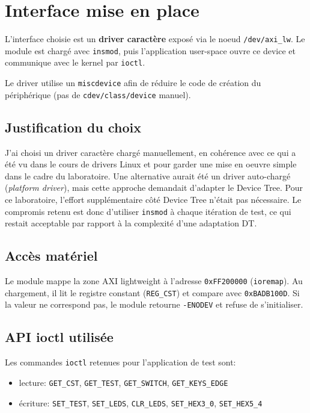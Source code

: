 \documentclass[a4paper,12pt]{article}
\begin{document}
\section{Interface mise en place}
L'interface choisie est un \textbf{driver caractère} exposé via le noeud
\texttt{/dev/axi\_lw}.
Le module est chargé avec \texttt{insmod}, puis l'application user-space ouvre
ce device et communique avec le kernel par \texttt{ioctl}.

Le driver utilise un \texttt{miscdevice} afin de réduire le code de création
du périphérique (pas de \texttt{cdev/class/device} manuel).

\subsection*{Justification du choix}
J'ai choisi un driver caractère chargé manuellement, en cohérence avec ce qui a
été vu dans le cours de drivers Linux et pour garder une mise en oeuvre simple
dans le cadre du laboratoire.
Une alternative aurait été un driver auto-chargé (\textit{platform driver}),
mais cette approche demandait d'adapter le Device Tree.
Pour ce laboratoire, l'effort supplémentaire côté Device Tree n'était pas
nécessaire.
Le compromis retenu est donc d'utiliser \texttt{insmod} à chaque itération de
test, ce qui restait acceptable par rapport à la complexité d'une adaptation DT.

\subsection*{Accès matériel}
Le module mappe la zone AXI lightweight à l'adresse \texttt{0xFF200000}
(\texttt{ioremap}).
Au chargement, il lit le registre constant (\texttt{REG\_CST}) et compare avec
\texttt{0xBADB100D}. Si la valeur ne correspond pas, le module retourne
\texttt{-ENODEV} et refuse de s'initialiser.

\newpage

\subsection*{API ioctl utilisée}
Les commandes \texttt{ioctl} retenues pour l'application de test sont:
\begin{itemize}
    \item lecture: \texttt{GET\_CST}, \texttt{GET\_TEST}, \texttt{GET\_SWITCH}, \texttt{GET\_KEYS\_EDGE}
    \item écriture: \texttt{SET\_TEST}, \texttt{SET\_LEDS}, \texttt{CLR\_LEDS}, \texttt{SET\_HEX3\_0}, \texttt{SET\_HEX5\_4}
\end{itemize}
\end{document}
